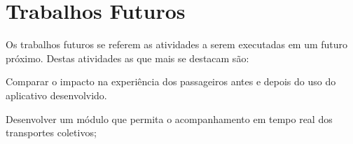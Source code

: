 \section{Trabalhos Futuros}

Os trabalhos futuros se referem as atividades a serem executadas em um futuro próximo. Destas atividades as que mais se destacam são:

\begin{lista}
\item Comparar o impacto na experiência dos passageiros antes e depois do uso do aplicativo desenvolvido.
\item Desenvolver um módulo que permita o acompanhamento em tempo real dos transportes coletivos;
\end{lista}